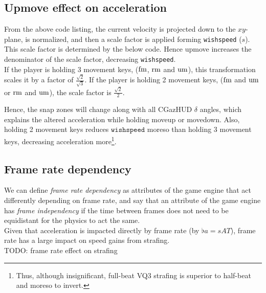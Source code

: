 \subsection{Upmove effect on acceleration}
\label{sec:upmove}
From the above code listing, the current velocity is projected down to the $xy$-plane, is normalized, and then a scale factor is applied forming \texttt{wishspeed} ($s$).
This scale factor is determined by the below code.
Hence upmove increases the denominator of the scale factor, decreasing \texttt{wishspeed}.\\
If the player is holding 3 movement keys, ($\operatorname{fm}$, $\operatorname{rm}$ and $\operatorname{um}$), this transformation scales it by a factor of $\frac{\sqrt{2}}{\sqrt{3}}$.
If the player is holding 2 movement keys, ($\operatorname{fm}$ and $\operatorname{um}$ or $\operatorname{rm}$ and $\operatorname{um}$), the scale factor is $\frac{\sqrt{2}}{2}$.

Hence, the snap zones will change along with all CGazHUD $\delta$ angles, which explains the altered acceleration while holding moveup or movedown.
Also, holding 2 movement keys reduces $\texttt{wishspeed}$ moreso than holding 3 movement keys, decreasing acceleration more\footnote{Thus, although insignificant, full-beat VQ3 strafing is superior to half-beat and moreso to invert.}.


\subsection{Frame rate dependency}
\label{sec:framerate}
We can define \emph{frame rate dependency} as attributes of the game engine that act differently depending on frame rate,
and say that an attribute of the game engine has \emph{frame independency} if the time between frames does not need to be equidistant for the physics to act the same.\\

Given that acceleration is impacted directly by frame rate (by $\flat{a} = sAT$), frame rate has a large impact on speed gains from strafing.\\
TODO: frame rate effect on strafing\\


